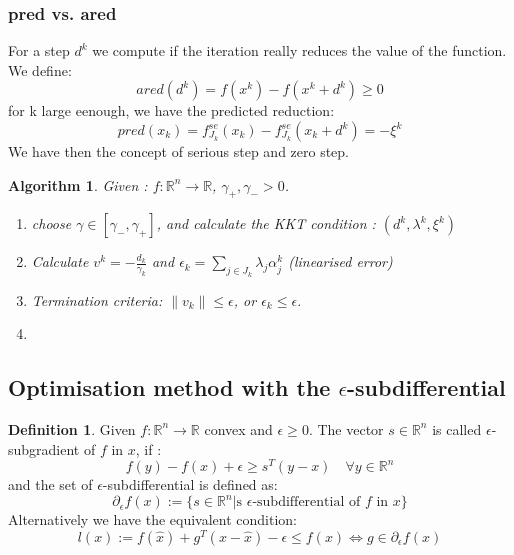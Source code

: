 \documentclass[a4paper,11pt,fleqn, draft]{book}
\newtheorem{algorithmthm}{Algorithm}[section]
\theoremstyle{definition}
\newtheorem{definition}{Definition}[section]
\theoremstyle{remark}
\begin{document}
\subsubsection*{pred vs. ared}
For a step $d^k$ we compute if the iteration really reduces the value of the function. We define:
\begin{equation*}
	ared(d^k) = f(x^k) - f(x^k + d^k) \geq 0
\end{equation*}
for k large eenough, we have the predicted reduction:
\begin{equation*}
	pred(x_k) = f_{J_k}^{se}(x_k) - f_{J_k}^{se}(x_k + d^k) = -\xi^k
\end{equation*}
We have then the concept of serious step and zero step.

\begin{algorithmthm}
Given : $f: \mathbb{R}^n \rightarrow \mathbb{R}$, $\gamma_+, \gamma_- > 0$. 
	\begin{enumerate}
		\item choose $\gamma \in [\gamma_-, \gamma_+]$, and calculate the KKT condition : $(d^k, \lambda^k, \xi^k)$
		\item Calculate $v^k = - \frac{d_k}{\gamma_k}$ and $\epsilon_k = \sum_{j \in J_k} \lambda_j \alpha_j^k$ (linearised error)
		\item Termination criteria: $\| v_k \| \leq \epsilon$, or $\epsilon_k \leq \epsilon$. 
		\item 
	\end{enumerate}
\end{algorithmthm}


\subsection{Optimisation method with the $\epsilon$-subdifferential}

\begin{definition}
	Given $f :\mathbb{R}^n \rightarrow \mathbb{R}$ convex and $\epsilon \geq 0$. The vector $s \in \mathbb{R}^n$ is called $\epsilon$-subgradient of $f$ in $x$, if :
	\begin{equation*}
		f(y) - f(x) + \epsilon \geq s^T(y-x) \quad \forall y \in \mathbb{R}^n
	\end{equation*}
	and the set of $\epsilon$-subdifferential is defined as:
	\begin{equation*}
		\partial_\epsilon f(x):=  \{ s \in \mathbb{R}^n | \text{s  $\epsilon$-subdifferential of $f$ in $x$} \}
	\end{equation*}
	Alternatively we have the equivalent condition:
	\begin{equation*}
		l(x) := f(\hat{x}) + g^T( x - \hat{x})- \epsilon \leq f(x) \Leftrightarrow g \in \partial_\epsilon f(x)
	\end{equation*}
\end{definition}
\end{document}

